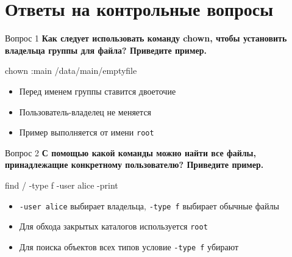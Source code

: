 \documentclass[
  ignorenonframetext,
  aspectratio=169,
  russian,
]{beamer}
\newenvironment{Shaded}{\begin{snugshade}}{\end{snugshade}}
\newcommand{\AttributeTok}[1]{\textcolor[rgb]{0.40,0.45,0.13}{#1}}
\newcommand{\FunctionTok}[1]{\textcolor[rgb]{0.28,0.35,0.67}{#1}}
\newcommand{\NormalTok}[1]{\textcolor[rgb]{0.00,0.23,0.31}{#1}}
\providecommand{\tightlist}{%
  \setlength{\itemsep}{0pt}\setlength{\parskip}{0pt}}
\begin{document}
\section{Ответы на контрольные
вопросы}\label{ux43eux442ux432ux435ux442ux44b-ux43dux430-ux43aux43eux43dux442ux440ux43eux43bux44cux43dux44bux435-ux432ux43eux43fux440ux43eux441ux44b}

\begin{frame}[fragile]{Вопрос 1}
\protect{}\label{ux432ux43eux43fux440ux43eux441-1}
\textbf{Как следует использовать команду chown, чтобы установить
владельца группы для файла? Приведите пример.}

\begin{Shaded}
\begin{Highlighting}[]
\FunctionTok{chown}\NormalTok{ :main /data/main/emptyfile}
\end{Highlighting}
\end{Shaded}

\begin{itemize}
\tightlist
\item
  Перед именем группы ставится двоеточие
\item
  Пользователь-владелец не меняется
\item
  Пример выполняется от имени \texttt{root}
\end{itemize}
\end{frame}

\begin{frame}[fragile]{Вопрос 2}
\protect{}\label{ux432ux43eux43fux440ux43eux441-2}
\textbf{С помощью какой команды можно найти все файлы, принадлежащие
конкретному пользователю? Приведите пример.}

\begin{Shaded}
\begin{Highlighting}[]
\FunctionTok{find}\NormalTok{ / }\AttributeTok{{-}type}\NormalTok{ f }\AttributeTok{{-}user}\NormalTok{ alice }\AttributeTok{{-}print}
\end{Highlighting}
\end{Shaded}

\begin{itemize}
\tightlist
\item
  \texttt{-user\ alice} выбирает владельца, \texttt{-type\ f} выбирает
  обычные файлы
\item
  Для обхода закрытых каталогов используется \texttt{root}
\item
  Для поиска объектов всех типов условие \texttt{-type\ f} убирают
\end{itemize}
\end{frame}
\end{document}
